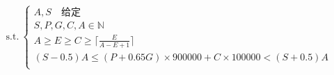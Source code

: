 \documentclass[preview]{standalone}
\begin{document}
\begin{align*}
\text{s.t.}~\begin{cases}A, S \quad \text{给定} \\S, P, G, C, A \in \mathbb{N} \\A \geq E \geq C \geq \lceil \frac{E}{A - E + 1} \rceil \\(S - 0.5)A \leq (P + 0.65 G) \times 900000 + C \times 100000 < (S + 0.5)A \\\end{cases}
\end{align*}
\end{document}
